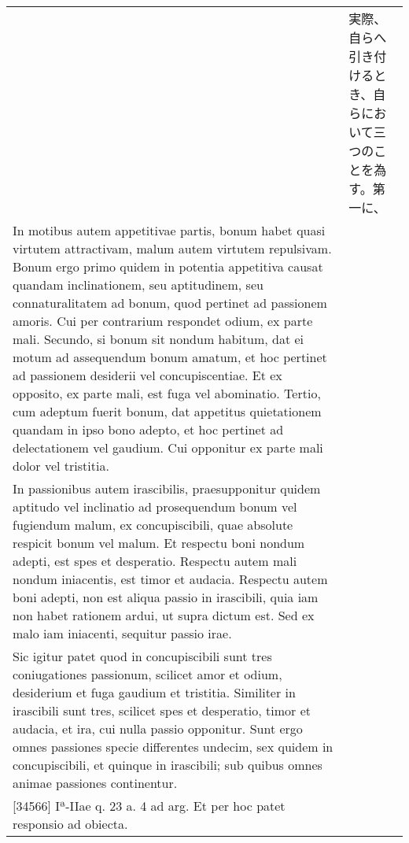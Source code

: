 \documentclass[10pt]{jsarticle} %
\begin{document}
\begin{longtable}{p{21em}p{21em}}
&

実際、自らへ引き付けるとき、自らにおいて三つのことを為す。第一に、

\\

In motibus autem
appetitivae partis, bonum habet quasi virtutem attractivam, malum autem
virtutem repulsivam. Bonum ergo primo quidem in potentia appetitiva
causat quandam inclinationem, seu aptitudinem, seu connaturalitatem ad
bonum, quod pertinet ad passionem amoris. Cui per contrarium respondet
odium, ex parte mali. Secundo, si bonum sit nondum habitum, dat ei motum
ad assequendum bonum amatum, et hoc pertinet ad passionem desiderii vel
concupiscentiae. Et ex opposito, ex parte mali, est fuga vel
abominatio. Tertio, cum adeptum fuerit bonum, dat appetitus quietationem
quandam in ipso bono adepto, et hoc pertinet ad delectationem vel
gaudium. Cui opponitur ex parte mali dolor vel tristitia. 

&


\\

In passionibus
autem irascibilis, praesupponitur quidem aptitudo vel inclinatio ad
prosequendum bonum vel fugiendum malum, ex concupiscibili, quae absolute
respicit bonum vel malum. Et respectu boni nondum adepti, est spes et
desperatio. Respectu autem mali nondum iniacentis, est timor et
audacia. Respectu autem boni adepti, non est aliqua passio in
irascibili, quia iam non habet rationem ardui, ut supra dictum est. Sed
ex malo iam iniacenti, sequitur passio irae. 


&


\\


Sic igitur patet quod in
concupiscibili sunt tres coniugationes passionum, scilicet amor et
odium, desiderium et fuga gaudium et tristitia. Similiter in irascibili
sunt tres, scilicet spes et desperatio, timor et audacia, et ira, cui
nulla passio opponitur. Sunt ergo omnes passiones specie differentes
undecim, sex quidem in concupiscibili, et quinque in irascibili; sub
quibus omnes animae passiones continentur.

&


\\


[34566] Iª-IIae q. 23 a. 4 ad arg.
Et per hoc patet responsio ad obiecta.

&


\end{longtable}
\end{document}
